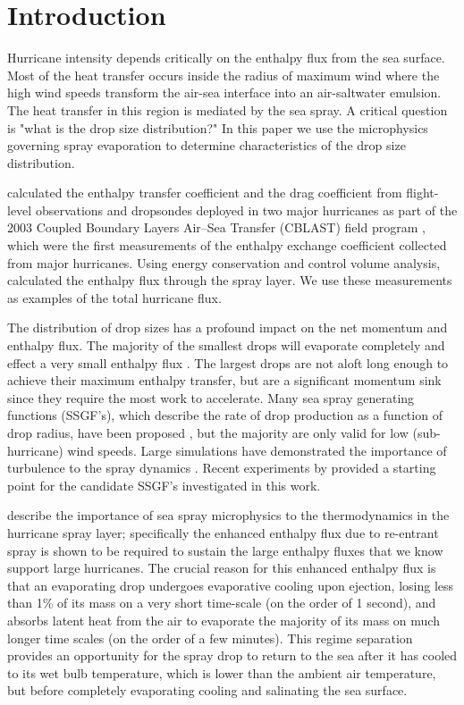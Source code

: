 \documentclass[10pt,a4paper]{article}
\begin{document}
\section{Introduction}
Hurricane intensity depends critically on the enthalpy flux from the sea surface. Most of the heat transfer occurs inside the radius of maximum wind where the high wind speeds transform the air-sea interface into an air-saltwater emulsion. The heat transfer in this region is mediated by the sea spray. A critical question is "what is the drop size distribution?" In this paper we use the microphysics governing spray evaporation to determine characteristics of the drop size distribution.\par
\citet{Bell2012} calculated the enthalpy transfer coefficient and the drag coefficient from flight-level observations and dropsondes deployed in two major hurricanes as part of the 2003 Coupled Boundary Layers Air–Sea Transfer (CBLAST) field program \citep{Black2007}, which were the first measurements of the enthalpy exchange coefficient collected from major hurricanes. Using energy conservation and control volume analysis, \citet{Bell2012} calculated the enthalpy flux through the spray layer. We use these measurements as examples of the total hurricane flux.\par
The distribution of drop sizes has a profound impact on the net momentum and enthalpy flux. The majority of the smallest drops will evaporate completely and effect a very small enthalpy flux \citep{Andreas2001}. The largest drops are not aloft long enough to achieve their maximum enthalpy transfer, but are a significant momentum sink since they require the most work to accelerate. Many sea spray generating functions (SSGF's), which describe the rate of drop production as a function of drop radius, have been proposed \citep{Fairall1996}, but the majority are only valid for low (sub-hurricane) wind speeds. Large simulations have demonstrated the importance of turbulence to the spray dynamics \citep{Shpund2011,Shpund2012,Shpund2014}. Recent experiments by \citet{Ortiz-Suslow2016} provided a starting point for the candidate SSGF's investigated in this work.\par
 \citet{Andreas2001} describe the importance of sea spray microphysics to the thermodynamics in the hurricane spray layer; specifically the enhanced enthalpy flux due to re-entrant spray is shown to be required to sustain the large enthalpy fluxes that we know support large hurricanes. The crucial reason for this enhanced enthalpy flux is that an evaporating drop undergoes evaporative cooling upon ejection, losing less than 1\% of its mass on a very short time-scale (on the order of 1 second), and absorbs latent heat from the air to evaporate the majority of its mass on much longer time scales (on the order of a few minutes). This regime separation provides an opportunity for the spray drop to return to the sea after it has cooled to its wet bulb temperature, which is lower than the ambient air temperature, but before completely evaporating cooling and salinating the sea surface. \par 
\end{document}
